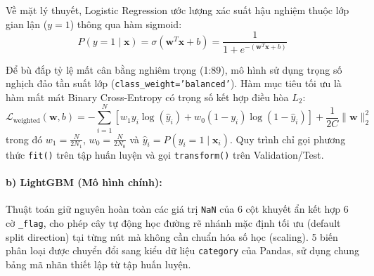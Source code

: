 Về mặt lý thuyết, Logistic Regression ước lượng xác suất hậu nghiệm thuộc lớp gian lận ($y = 1$) thông qua hàm sigmoid:
\begin{equation}
  P(y = 1 \mid \mathbf{x}) = \sigma(\mathbf{w}^T \mathbf{x} + b) = \frac{1}{1 + e^{-(\mathbf{w}^T \mathbf{x} + b)}}
  \label{eq:lr_prob}
\end{equation}

Để bù đắp tỷ lệ mất cân bằng nghiêm trọng (1:89), mô hình sử dụng trọng số nghịch đảo tần suất lớp (\texttt{class\_weight='balanced'}). Hàm mục tiêu tối ưu là hàm mất mát Binary Cross-Entropy có trọng số kết hợp điều hòa $L_2$:
\begin{equation}
  \mathcal{L}_{\text{weighted}}(\mathbf{w}, b) = -\sum_{i=1}^{N} \left[ w_1 y_i \log(\hat{y}_i) + w_0 (1 - y_i) \log(1 - \hat{y}_i) \right] + \frac{1}{2C} \|\mathbf{w}\|_2^2
  \label{eq:lr_loss}
\end{equation}
trong đó $w_1 = \frac{N}{2 N_1}$, $w_0 = \frac{N}{2 N_0}$ và $\hat{y}_i = P(y_i = 1 \mid \mathbf{x}_i)$. Quy trình chỉ gọi phương thức \texttt{fit()} trên tập huấn luyện và gọi \texttt{transform()} trên Validation/Test.

\paragraph{b) LightGBM (Mô hình chính):}
Thuật toán giữ nguyên hoàn toàn các giá trị \texttt{NaN} của 6 cột khuyết ẩn kết hợp 6 cờ \texttt{\_flag}, cho phép cây tự động học đường rẽ nhánh mặc định tối ưu (default split direction) tại từng nút mà không cần chuẩn hóa số học (scaling). 5 biến phân loại được chuyển đổi sang kiểu dữ liệu \texttt{category} của Pandas, sử dụng chung bảng mã nhãn thiết lập từ tập huấn luyện.

